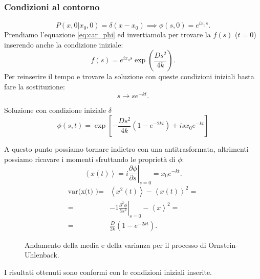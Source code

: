 \subsubsection{Condizioni al contorno}%
\label{subsub:Condizioni al contorno}
\[
    P(x,0|x_0,0) = \delta (x-x_0) \implies  \phi (s,0) = e^{ix_0s}
.\] 
Prendiamo l'equazione \ref{eq:car_phi} ed invertiamola per trovare la $f(s)$ ($t=0$) inserendo anche la condizione iniziale:
\[
	f(s) = e^{ix_0s}\exp\left(\frac{Ds^2}{4k}\right)
.\] 
Per reinserire il tempo e trovare la soluzione con queste condizioni iniziali basta fare la sostituzione:
\[
    s \to se^{-kt}
.\] 
\begin{redbox}{Soluzione con condizione iniziale $\delta$}
    \begin{equation}
	\phi(s,t) =
	\exp\left[-\frac{Ds^2}{4k}\left(1-e^{-2kt}\right) + isx_0e^{-kt}\right]
    \end{equation}
\end{redbox}
\noindent
A questo punto possiamo tornare indietro con una antitrasformata, altrimenti possiamo ricavare i momenti sfruttando le proprietà di $\phi$:
\[
    \left<x(t)\right> = \left.i\frac{\partial \phi}{\partial s} \right|_{s=0} = x_0e^{-kt}
.\] 
\[\begin{aligned}
    \text{var(x(t) )} =& \left<x^2(t)\right> - \left<x(t)\right>^2 = \\
    =& \left.-1 \frac{\partial ^2\phi}{\partial s^2}\right|_{s=0} - \left<x\right>^2 = \\
    =&\frac{D}{2k}\left(1-e^{-2kt}\right)
.\end{aligned}\]

\begin{figure}[H]
    \centering
    \caption{\scriptsize Andamento della media e della varianza per il processo di Ornstein-Uhlenback.}
    \label{fig:mean-var}
\end{figure}
\noindent
I risultati ottenuti sono conformi con le condizioni iniziali inserite. 
